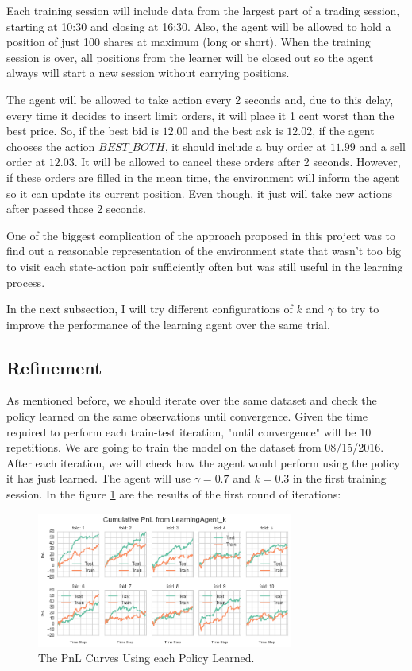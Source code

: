 \documentclass[a4paper]{article}
\begin{document}
Each training session will include data from the largest part of a trading session, starting at 10:30 and closing at 16:30. Also, the agent will be allowed to hold a position of just 100 shares at maximum (long or short). When the training session is over, all positions from the learner will be closed out so the agent always will start a new session without carrying positions.

The agent will be allowed to take action every 2 seconds and, due to this delay, every time it decides to insert limit orders, it will place it 1 cent worst than the best price. So, if the best bid is $12.00$ and the best ask is $12.02$, if the agent chooses the action $BEST\_BOTH$, it should include a buy order at $11.99$ and a sell order at $12.03$. It will be allowed to cancel these orders after 2 seconds. However, if these orders are filled in the mean time, the environment will inform the agent so it can update its current position. Even though, it just will take new actions after passed those 2 seconds.

One of the biggest complication of the approach proposed in this project was to find out a reasonable representation of the environment state that wasn't too big to visit each state-action pair sufficiently often but was still useful in the learning process.

In the next subsection, I will try different configurations of $k$ and $\gamma$ to try to improve the performance of the learning agent over the same trial.

\subsection{Refinement}
As mentioned before, we should iterate over the same dataset and check the policy learned on the same observations until convergence. Given the time required to perform each train-test iteration, "until convergence" will be 10 repetitions. We are going to train the model on the dataset from 08/15/2016. After each iteration, we will check how the agent would perform using the policy it has just learned. The agent will use $\gamma=0.7$ and $k=0.3$ in the first training session. In the figure \ref{fig:policy_test_1} are the results of the first round of iterations:

\begin{figure}[ht]
\centering
\includegraphics[width=0.75\textwidth]{figures/policy_tests_1.png}
\caption{\label{fig:policy_test_1}The PnL Curves Using each Policy Learned.}
\end{figure}
\end{document}
